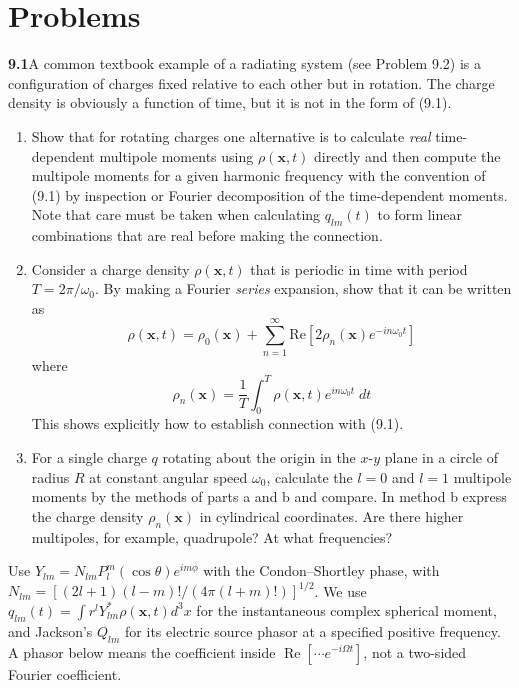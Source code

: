 
\section*{Problems}

\par\bigskip
\noindent\textbf{9.1}\quad A common textbook example of a radiating system (see Problem 9.2) is a configuration of charges fixed relative to each other but in rotation. The charge density is obviously a function of time, but it is not in the form of (9.1).
\begin{enumerate}
\item[(a)] Show that for rotating charges one alternative is to calculate \emph{real} time-dependent multipole moments using $\rho(\mathbf{x},t)$ directly and then compute the multipole moments for a given harmonic frequency with the convention of (9.1) by inspection or Fourier decomposition of the time-dependent moments. Note that care must be taken when calculating $q_{lm}(t)$ to form linear combinations that are real before making the connection.
\item[(b)] Consider a charge density $\rho(\mathbf{x},t)$ that is periodic in time with period $T=2\pi/\omega_{0}$. By making a Fourier \emph{series} expansion, show that it can be written as
\[
\rho(\mathbf{x},t)=\rho_{0}(\mathbf{x})+\sum_{n=1}^{\infty}\mathrm{Re}[2\rho_{n}(\mathbf{x})e^{-in\omega_{0}t}]
\]
where
\[
\rho_{n}(\mathbf{x})=\frac{1}{T}\int_{0}^{T}\rho(\mathbf{x},t)e^{in\omega_{0}t}\;dt
\]
This shows explicitly how to establish connection with (9.1).
\item[(c)] For a single charge $q$ rotating about the origin in the $x$-$y$ plane in a circle of radius $R$ at constant angular speed $\omega_{0}$, calculate the $l=0$ and $l=1$ multipole moments by the methods of parts a and b and compare. In method b express the charge density $\rho_{n}(\mathbf{x})$ in cylindrical coordinates. Are there higher multipoles, for example, quadrupole? At what frequencies?
\end{enumerate}
\solution

Use $Y_{lm}=N_{lm}P_l^m(\cos\theta)e^{im\phi}$ with the
Condon--Shortley phase, with
$N_{lm}=[(2l+1)(l-m)!/(4\pi(l+m)!)]^{1/2}$.
We use $q_{lm}(t)=\int r^lY_{lm}^*\rho(\mathbf x,t)d^3x$ for the
instantaneous complex spherical moment, and Jackson's $Q_{lm}$ for
its electric source phasor at a specified positive frequency.
A phasor below means the coefficient inside
$\operatorname{Re}[\cdots e^{-i\Omega t}]$, not a two-sided Fourier coefficient.


